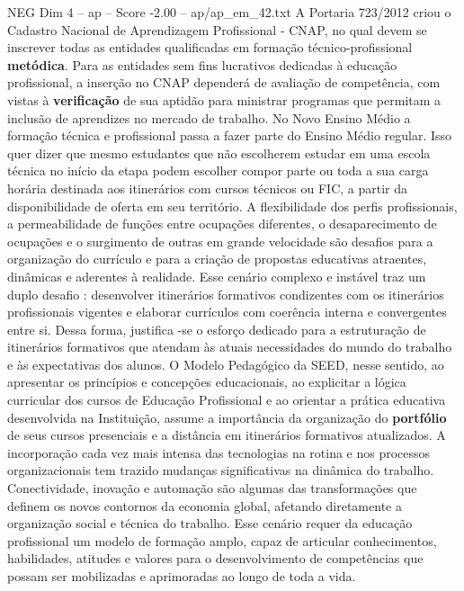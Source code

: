 \begin{textsample}{NEG Dim 4 – ap – Score -2.00 – ap/ap\_em\_42.txt}  \label{ex:f4_neg_055}
A Portaria 723/2012 criou o Cadastro Nacional de Aprendizagem Profissional - CNAP, no qual devem se inscrever todas as entidades qualificadas em formação técnico-profissional \textbf{metódica}.
Para as entidades sem fins lucrativos dedicadas à educação profissional, a inserção no CNAP dependerá de avaliação de competência, com vistas à \textbf{verificação} de sua aptidão para ministrar programas que permitam a inclusão de aprendizes no mercado de trabalho.
No Novo Ensino Médio a formação técnica e profissional passa a fazer parte do Ensino Médio regular.
Isso quer dizer que mesmo estudantes que não escolherem estudar em uma escola técnica no início da etapa podem escolher compor parte ou toda a sua carga horária destinada aos itinerários com cursos técnicos ou FIC, a partir da disponibilidade de oferta em seu território.
A flexibilidade dos perfis profissionais, a permeabilidade de funções entre ocupações diferentes, o desaparecimento de ocupações e o surgimento de outras em grande velocidade são desafios para a organização do currículo e para a criação de propostas educativas atraentes, dinâmicas e aderentes à realidade.
Esse cenário complexo e instável traz um duplo desafio : desenvolver itinerários formativos condizentes com os itinerários profissionais vigentes e elaborar currículos com coerência interna e convergentes entre si.
Dessa forma, justifica -se o esforço dedicado para a estruturação de itinerários formativos que atendam às atuais necessidades do mundo do trabalho e às expectativas dos alunos.
O Modelo Pedagógico da SEED, nesse sentido, ao apresentar os princípios e concepções educacionais, ao explicitar a lógica curricular dos cursos de Educação Profissional e ao orientar a prática educativa desenvolvida na Instituição, assume a importância da organização do \textbf{portfólio} de seus cursos presenciais e a distância em itinerários formativos atualizados.
A incorporação cada vez mais intensa das tecnologias na rotina e nos processos organizacionais tem trazido mudanças significativas na dinâmica do trabalho.
Conectividade, inovação e automação são algumas das transformações que definem os novos contornos da economia global, afetando diretamente a organização social e técnica do trabalho.
Esse cenário requer da educação profissional um modelo de formação amplo, capaz de articular conhecimentos, habilidades, atitudes e valores para o desenvolvimento de competências que possam ser mobilizadas e aprimoradas ao longo de toda a vida.

\end{textsample}
